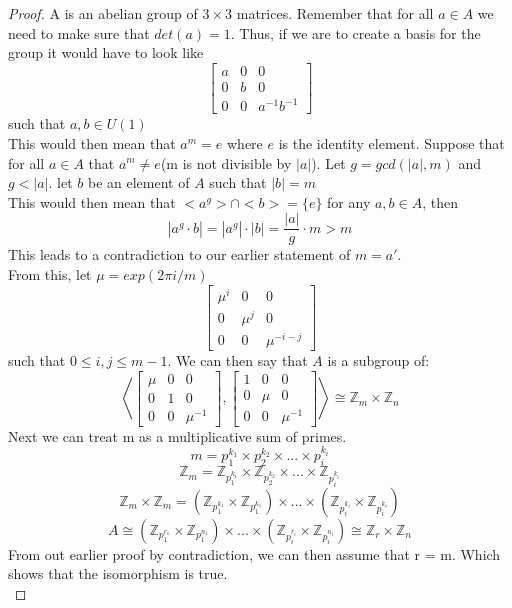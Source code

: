 \documentclass[12pt,journal,compsoc]{IEEEtran}
\newcommand{\Z}{\mathbb{Z}}
\begin{document}
\begin{proof}
A is an abelian group of $3 \times 3$ matrices. Remember that for all $a \in A$ we need to make sure that $det(a) = 1$. Thus, if we are to create a basis for the group it would have to look like
\[
	\left[ \begin{matrix}
	a & 0 & 0\\
	0 & b & 0\\
	0 & 0 & a^{-1}b^{-1}
	\end{matrix} \right]
\]
such that $a,b \in U(1)$\\
This would then mean that $a^m = e$ where $e$ is the identity element. Suppose that for all $a \in A$ that $a^m \neq e$(m is not divisible by $|a|$). Let $g = gcd(|a|,m)$ and $g < |a|$. let $b$ be an element of $A$ such that $|b| = m$\\
This would then mean that $<a^g> \cap <b> = \{e\}$ for any $a,b \in A$, then
\[ |a^g \cdot b| = |a^g| \cdot |b| = \frac{|a|}{g} \cdot m > m\]
This leads to a contradiction to our earlier statement of $m = a'$.\\
From this, let $\mu = exp(2\pi i/m)$
\[
	\left[\begin{matrix}
	\mu^i & 0 & 0\\
	0 & \mu^j & 0\\
	0 & 0 & \mu^{-i-j}
	\end{matrix}\right]
\]
such that $0 \leq i,j \leq m-1$. We can then say that $A$ is a subgroup of:
\[
	\left\langle 
	\left[\begin{matrix}
	\mu & 0 & 0\\
	0 & 1 & 0\\
	0 & 0 & \mu^{-1}
	\end{matrix}\right],
	\left[\begin{matrix}
	1 & 0 & 0\\
	0 & \mu & 0\\
	0 & 0 & \mu^{-1}
	\end{matrix}\right] 	
	\right\rangle \cong \Z_m \times \Z_n
\]
Next we can treat m as a multiplicative sum of primes.
\[ m = p_1^{k_1} \times p_2^{k_2} \times ... \times p_i^{k_i} \]
\[ \Z_m = \Z_{p_1^{k_1}} \times \Z_{p_2^{k_2}} \times ... \times \Z_{p_i^{k_i}} \]
\[ \Z_m \times \Z_m = (\Z_{p_1^{k_1}} \times \Z_{p_1^{k_1}}) \times ... \times (\Z_{p_i^{k_i}} \times \Z_{p_i^{k_i}}) \]
\[ A \cong (\Z_{p_1^{r_1}} \times \Z_{p_1^{n_1}}) \times ... \times (\Z_{p_i^{r_i}} \times \Z_{p_i^{n_i}}) \cong \Z_r \times \Z_n \]
From out earlier proof by contradiction, we can then assume that r = m. Which shows that the isomorphism is true.\\
\end{proof}
\end{document}

